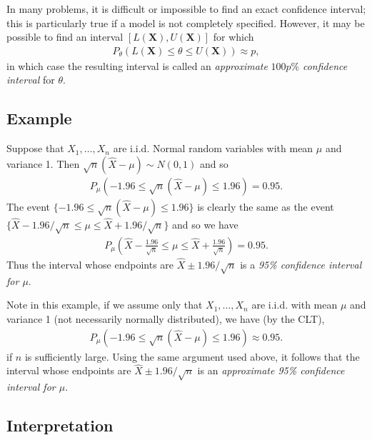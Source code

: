 \documentclass[11pt,a4paper]{article}
\begin{document}
In many problems, 
it is difficult or impossible to find an exact confidence interval; 
this is particularly true if a model is not completely specified. 
However, it may be possible to find an interval \(\left[L(\boldsymbol{X}), U(\boldsymbol{X})\right]\)
for which 
\begin{align}
P_{\theta} \left(L(\boldsymbol{X}) \leq \theta \leq U(\boldsymbol{X})\right) \approx p,
\end{align}
in which case the resulting interval is called an \emph{approximate} \(100p\%\)
\emph{confidence interval} for \(\theta\).

\subsection{Example}

Suppose that \(X_{1}, \ldots, X_{n}\) are i.i.d. Normal
random variables with mean \(\mu\) and variance 1. 
Then \(\sqrt{n}(\widehat{X} - \mu) \sim N(0,1)\) and so
\begin{align}\label{eq:standard}
P_{\mu}\left(-1.96 \leq \sqrt{n}(\widehat{X} - \mu) \leq 1.96 \right) = 0.95.
\end{align}
The event \(\{-1.96 \leq \sqrt{n}(\widehat{X} - \mu) \leq 1.96 \}\) is clearly 
the same as the event \(\{\widehat{X} - 1.96 / \sqrt{n} \leq \mu \leq \widehat{X} + 1.96 / \sqrt{n} \}\)
and so we have
\begin{align}
P_{\mu}\left(\widehat{X} - \frac{1.96}{\sqrt{n}} \leq \mu \leq \widehat{X} + \frac{1.96}{\sqrt{n}} \right) = 0.95.
\end{align}
Thus the interval whose endpoints are \(\widehat{X} \pm 1.96/\sqrt{n}\)
is a \emph{95\% confidence interval for \(\mu\)}.

Note in this example, 
if we assume only that \(X_{1}, \ldots, X_{n}\) are i.i.d.
with mean \(\mu\) and variance 1 (not necessarily normally distributed),
we have (by the CLT),
\begin{align}
P_{\mu}\left(-1.96 \leq \sqrt{n}(\widehat{X} - \mu) \leq 1.96 \right) \approx 0.95.
\end{align}
if \(n\) is sufficiently large. 
Using the same argument used above, 
it follows that the interval whose endpoints are \(\widehat{X} \pm 1.96/\sqrt{n}\) 
is an \emph{approximate 95\% confidence interval for \(\mu\)}.

\subsection{Interpretation}
\end{document}
